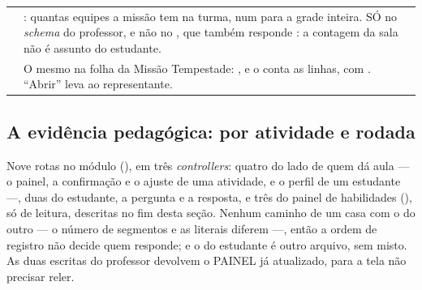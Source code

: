 \begin{tabularx}{\linewidth}{@{}L{46mm}X@{}}
\toprule
\headrow {} & \\
\midrule
{} & : quantas equipes a missão
  tem na turma, num  para a grade inteira. SÓ no \emph{schema} do
  professor, e não no , que também responde
  : a contagem da sala não é assunto do estudante.\\
 & O mesmo na folha da Missão
  Tempestade: , e o  conta as linhas, com
  . \enquote{Abrir} leva ao representante.\\
\bottomrule
\end{tabularx}

\subsection{A evidência pedagógica: por atividade e rodada}
\label{sec:api-evidencias}

Nove rotas no módulo  (), em três
\emph{controllers}: quatro do lado de quem dá aula --- o painel, a confirmação e
o ajuste de uma atividade, e o perfil de um estudante ---, duas do estudante, a
pergunta e a resposta, e três do painel de habilidades (), só de
leitura, descritas no fim desta seção. Nenhum caminho de um casa com o
do outro --- o número de segmentos e as literais diferem ---, então a ordem de
registro não decide quem responde; e o do estudante é outro arquivo, sem
 misto. As duas escritas do professor devolvem o PAINEL já
atualizado, para a tela não precisar reler.

